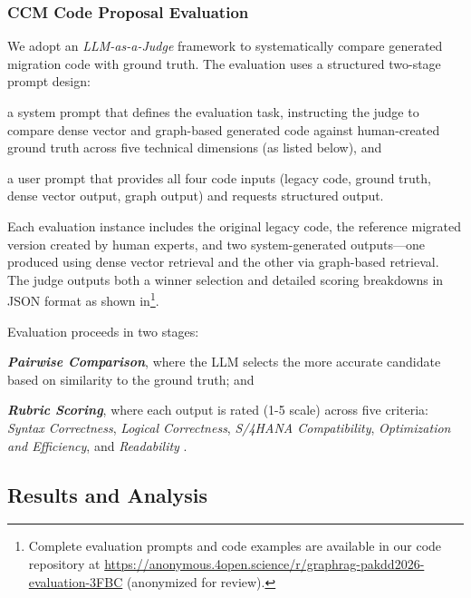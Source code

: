\documentclass[runningheads]{llncs}
\begin{document}
\subsubsection{CCM Code Proposal Evaluation}
We adopt an \textit{LLM-as-a-Judge} framework to systematically compare generated migration code with ground truth. The evaluation uses a structured two-stage prompt design: \begin{inparaenum}[(i)] \item a system prompt that defines the evaluation task, instructing the judge to compare dense vector and graph-based generated code against human-created ground truth across five technical dimensions (as listed below), and \item a user prompt that provides all four code inputs (legacy code, ground truth, dense vector output, graph output) and requests structured output. \end{inparaenum} Each evaluation instance includes the original legacy code, the reference migrated version created by human experts, and two system-generated outputs—one produced using dense vector retrieval and the other via graph-based retrieval. The judge outputs both a winner selection and detailed scoring breakdowns in JSON format as shown in\footnote{Complete evaluation prompts and code examples are available in our code repository at \url{https://anonymous.4open.science/r/graphrag-pakdd2026-evaluation-3FBC} (anonymized for review).}.

Evaluation proceeds in two stages: \begin{inparaenum}[(i)]
\item \textit{\textbf{Pairwise Comparison}}, where the LLM selects the more accurate candidate based on similarity to the ground truth; and 
\item \textit{\textbf{Rubric Scoring}}, where each output is rated (1-5 scale) across five criteria: \textit{Syntax Correctness}, \textit{Logical Correctness}, \textit{S/4HANA Compatibility}, \textit{Optimization and Efficiency}, and \textit{Readability} . 
\end{inparaenum}
\vspace{-10mm}
\subsection{Results and Analysis}
\vspace{-6mm}
\end{document}
